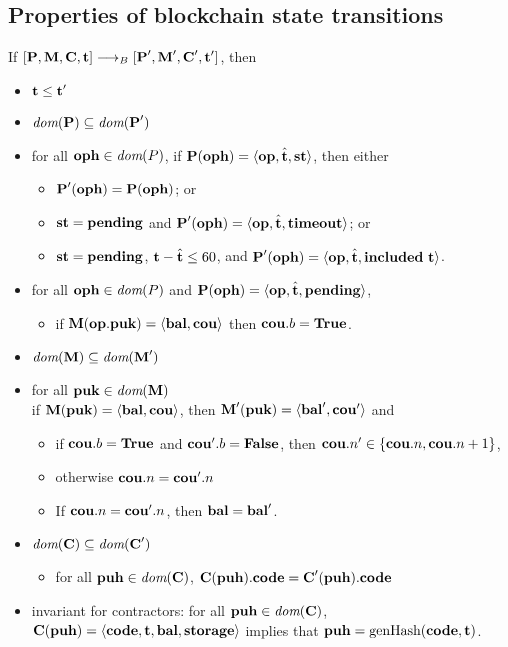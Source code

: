 \documentclass[a4paper]{llncs}
\begin{document}
\clearpage{}
\subsection{Properties of blockchain state transitions}

If $[\textbf{P}, \textbf{M}, \textbf{C}, \textbf{t}] \stackrel{{}}\longrightarrow_B{}
[\textbf{P}', \textbf{M}', \textbf{C}', \textbf{t}']$, then
\begin{itemize}
\item $\textbf{t} \le \textbf{t}'$
\item $\textit{dom} (\textbf{P}) \subseteq \textit{dom}(\textbf{P}')$
\item for all $\textbf{oph} \in \textit{dom}(P)$, if 
  $\textbf{P} (\textbf{oph}) = \langle\textbf{op},  \hat{\textbf{t}}, \textbf{st}\rangle$, then either
  \begin{itemize}
  \item     $\textbf{P}'    (\textbf{oph}) = \textbf{P} (\textbf{oph})$; or
  \item $\textbf{st}  = \textbf{pending}$ and $\textbf{P}' (\textbf{oph}) =
    \langle\textbf{op}, \hat{\textbf{t}}, \textbf{timeout}\rangle$; or
  \item  $\textbf{st}  = \textbf{pending}$, $\textbf{t} - \hat{\textbf{t}}
    \le 60 $, and
    $\textbf{P}' (\textbf{oph}) =       \langle\textbf{op}, \hat{\textbf{t}}, \textbf{included}\
      \textbf{t}\rangle$.
  \end{itemize}
 \item for all $\textbf{oph} \in \textit{dom}(P)$ and $\textbf{P} (\textbf{oph}) = \langle\textbf{op},  \hat{\textbf{t}}, \textbf{pending}\rangle$, 
    \begin{itemize}
    	\item  if $\textbf{M}(\textbf{op}.\textbf{puk}) =  \langle\textbf{bal}, \textbf{cou}\rangle$ then  
  $\textbf{cou}.b = \textbf{True}$.
    \end{itemize}
 \item $ \textit{dom} (\textbf{M}) \subseteq \textit{dom} (\textbf{M}')$
 \item for all $\textbf{puk} \in \textit{dom} (\textbf{M})$\\
   if $\textbf{M} (\textbf{puk}) =
   \langle\textbf{bal}, \textbf{cou}\rangle$, 
   then $\textbf{M}' (\textbf{puk}) =
   \langle\textbf{bal}', \textbf{cou}'\rangle$ and
   \begin{itemize}
   \item if $\textbf{cou}.b=\textbf{True}$ and $\textbf{cou}'.b=\textbf{False}$, then $\textbf{cou}.n' \in \{
     \textbf{cou}.n,  \textbf{cou}.n+1\}$,
   \item otherwise $\textbf{cou}.n = \textbf{cou}'.n$
   \item If $\textbf{cou}.n = \textbf{cou}'.n$, then $\textbf{bal} = \textbf{bal}'$.
   \end{itemize}

 \item $ \textit{dom} (\textbf{C}) \subseteq \textit{dom} (\textbf{C}')$
   \begin{itemize}
   \item for all $\textbf{puh} \in \textit{dom} (\textbf{C})$,
     $\textbf{C} (\textbf{puh}).\textbf{code} = \textbf{C}' (\textbf{puh}).\textbf{code}$
   \end{itemize}
 \item invariant for contractors:
   for all $\textbf{puh} \in \textit{dom} (\textbf{C})$,
   $\textbf{C} (\textbf{puh}) = \langle \textbf{code}, \textbf{t}, \textbf{bal}, \textbf{storage}\rangle$
   implies that $\textbf{puh} = \textup{genHash} (\textbf{code}, \textbf{t})$.
\end{itemize}
\end{document}
